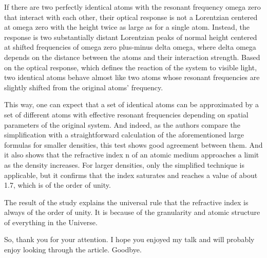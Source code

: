 \documentclass[a4paper, 12pt]{article}
\begin{document}
If there are two perfectly identical atoms with the resonant frequency 
omega zero that interact with each other, their optical response is not 
a Lorentzian centered at omega zero with the height twice as large as 
for a single atom. Instead, the response is two substantially distant 
Lorentzian peaks of normal height centered at shifted frequencies of 
omega zero plus-minus delta omega, where delta omega depends on the 
distance between the atoms and their interaction strength. Based on the 
optical response, which defines the reaction of the system to visible 
light, two identical atoms behave almost like two atoms whose resonant 
frequencies are slightly shifted from the original atoms' frequency.

This way, one can expect that a set of identical atoms can be 
approximated by a set of different atoms with effective resonant 
frequencies depending on spatial parameters of the original system. And 
indeed, as the authors compare the simplification with a straightforward 
calculation of the aforementioned large formulas for smaller densities, 
this test shows good agreement between them. And it also shows that the 
refractive index n of an atomic medium approaches a limit as the density 
increases. For larger densities, only the simplified technique is 
applicable, but it confirms that the index saturates and reaches a value 
of about 1.7, which is of the order of unity.

The result of the study explains the universal rule that the refractive 
index is always of the order of unity. It is because of the granularity 
and atomic structure of everything in the Universe.

So, thank you for your attention. I hope you enjoyed my talk and will 
probably enjoy looking through the article. Goodbye.
\end{document}
